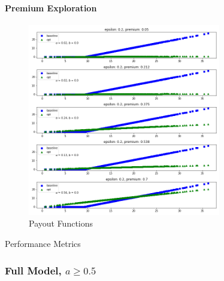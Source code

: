 \documentclass[11pt]{article}
\begin{document}
            \paragraph*{Premium Exploration}
                \begin{figure}[H]
                    \centering
                    \caption{Payout Functions}
                    \includegraphics[width=0.75\textwidth]{../../output/figures/CVaR/premium_exploration_slope.png}
                \end{figure}

                \begin{table}[H]
                    \centering
                    \caption{Performance Metrics}
                    
                \end{table}

                \FloatBarrier

        \subsubsection*{Full Model, $a \geq 0.5$}
\end{document}
